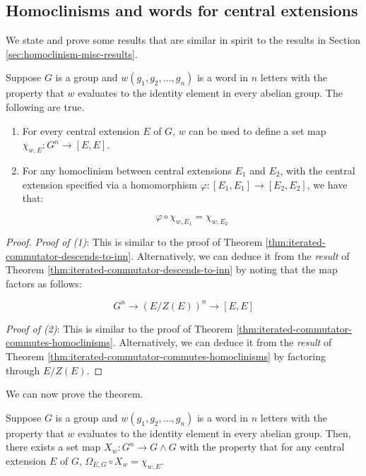 \documentclass{ucetd}
\begin{document}
\subsection{Homoclinisms and words for central extensions}\label{sec:homoclinisms-words-central-extensions}

We state and prove some results that are similar in spirit to the
results in Section \ref{sec:homoclinism-misc-results}.

\begin{lemma}\label{lemma:iterated-commutator-descends-extension-version}
  Suppose $G$ is a group and $w(g_1,g_2,\dots,g_n)$ is a word in $n$
  letters with the property that $w$ evaluates to the identity element
  in every abelian group. The following are true.

  \begin{enumerate}
  \item For every central extension $E$ of $G$, $w$ can be used to
    define a set map $\chi_{w,E}: G^n \to [E,E]$.
  \item For any homoclinism between central extensions $E_1$ and
    $E_2$, with the central extension specified via a homomorphism
    $\varphi:[E_1,E_1] \to [E_2,E_2]$, we have that:

    $$\varphi \circ \chi_{w,E_1} = \chi_{w,E_2}$$
  \end{enumerate}
\end{lemma}


\begin{proof}
  {\em Proof of (1)}: This is similar to the proof of Theorem
  \ref{thm:iterated-commutator-descends-to-inn}. Alternatively, we can
  deduce it from the {\em result} of Theorem
  \ref{thm:iterated-commutator-descends-to-inn} by noting that the
  map factors as follows:

  $$G^n \to (E/Z(E))^n \to [E,E]$$

  {\em Proof of (2)}: This is similar to the proof of Theorem
  \ref{thm:iterated-commutator-commutes-homoclinisms}. Alternatively,
  we can deduce it from the {\em result} of Theorem
  \ref{thm:iterated-commutator-commutes-homoclinisms} by factoring
  through $E/Z(E)$.
\end{proof}

We can now prove the theorem.

\begin{theorem}\label{thm:iterated-commutator-map-to-exteriorsquare}
  Suppose $G$ is a group and $w(g_1,g_2,\dots,g_n)$ is a word in $n$
  letters with the property that $w$ evaluates to the identity element
  in every abelian group. Then, there exists a set map $X_w:G^n \to G
  \wedge G$ with the property that for any central extension $E$ of
  $G$, $\Omega_{E,G} \circ X_w = \chi_{w,E}$.
\end{theorem}
\end{document}
